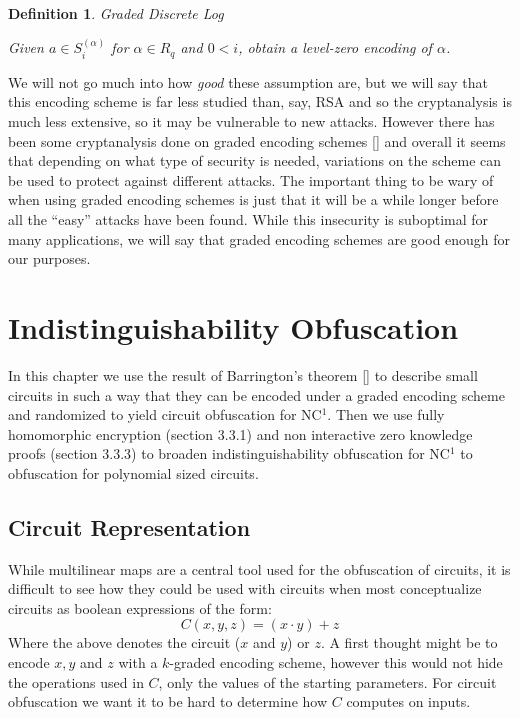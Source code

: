 \documentclass[12pt,twoside]{reedthesis}
\newtheorem{definition}{Definition}
\begin{document}
    \begin{definition}{Graded Discrete Log}
    \par Given $a\in S_i^{(\alpha)}$ for $\alpha \in R_q$ and $0<i$, obtain a level-zero encoding of $\alpha$.
    \end{definition}
    
    We will not go much into how \textit{good} these assumption are, but we will say that this encoding scheme is far less studied than, say, RSA and so the cryptanalysis is much less extensive, so it may be vulnerable to new attacks. However there has been some cryptanalysis done on graded encoding schemes [\cite{GGH13}] and overall it seems that depending on what type of security is needed, variations on the scheme can be used to protect against different attacks. The important thing to be wary of when using graded encoding schemes is just that it will be a while longer before all the ``easy'' attacks have been found. While this insecurity is suboptimal for many applications, we will say that graded encoding schemes are good enough for our purposes.
    
    
    
    
    
    \chapter{Indistinguishability Obfuscation}
    In this chapter we use the result of Barrington's theorem [\cite{Barrington:1986:BPB:12130.12131}] to describe small circuits in such a way that they can be encoded under a graded encoding scheme and randomized to yield circuit obfuscation for NC$^1$. Then we use fully homomorphic encryption (section 3.3.1) and non interactive zero knowledge proofs (section 3.3.3) to broaden indistinguishability obfuscation for NC$^1$ to obfuscation for polynomial sized circuits.
    
    
    \section{Circuit Representation}
    While multilinear maps are a central tool used for the obfuscation of circuits, it is difficult to see how they could be used with circuits when most conceptualize circuits as boolean expressions of the form:
    $$C(x,y,z) = (x \cdot y) + z $$
    Where the above denotes the circuit ($x$ and $y$) or $z$. A first thought might be to encode $x,y$ and $z$ with a $k$-graded encoding scheme, however this would not hide the operations used in $C$, only the values of the starting parameters. For circuit obfuscation we want it to be hard to determine how $C$ computes on inputs.
    
\end{document}
